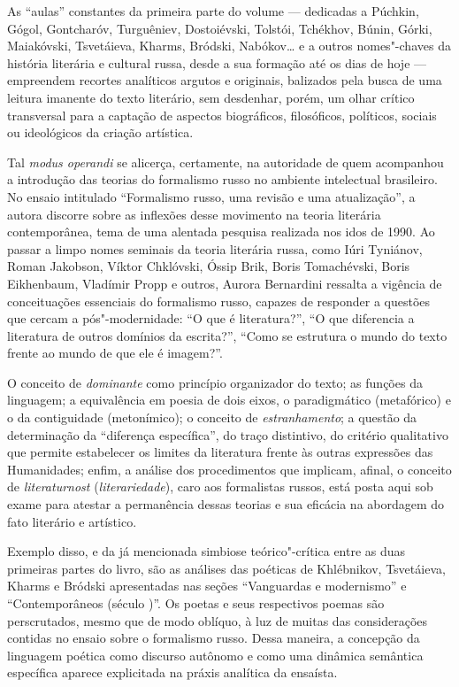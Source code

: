 As ``aulas'' constantes da primeira parte do volume --- dedicadas a
Púchkin, Gógol, Gontcharóv, Turguêniev, Dostoiévski, Tolstói, Tchékhov,
Búnin, Górki, Maiakóvski, Tsvetáieva, Kharms, Bródski, Nabókov\ldots{} e a outros nomes"-chaves da
história literária e cultural russa, desde a sua formação até os dias de
hoje --- empreendem recortes analíticos argutos e originais, balizados pela busca de uma leitura imanente do
texto literário, sem desdenhar, porém, um olhar crítico transversal para
a captação de aspectos biográficos, filosóficos, políticos, sociais ou
ideológicos da criação artística.

Tal \emph{modus operandi} se alicerça, certamente, na autoridade de quem
acompanhou a introdução das teorias do formalismo russo no ambiente
intelectual brasileiro. No ensaio intitulado ``Formalismo
russo, uma revisão e uma atualização'', a autora discorre sobre as
inflexões desse movimento na teoria literária contemporânea,
tema de uma alentada pesquisa realizada nos idos de 1990. Ao
passar a limpo nomes seminais da teoria literária russa, como Iúri
Tyniánov, Roman Jakobson, Víktor Chklóvski, Óssip Brik, Boris Tomachévski,
Boris Eikhenbaum, Vladímir Propp e outros, Aurora Bernardini ressalta a
vigência de conceituações essenciais do formalismo russo, capazes de
responder a questões que cercam a pós"-modernidade: ``O que é
literatura?'', ``O que diferencia a literatura de outros domínios da
escrita?'', ``Como se estrutura o mundo do texto frente ao mundo de que
ele é imagem?''.

O conceito de \emph{dominante} como princípio organizador do texto; as
funções da linguagem; a equivalência em poesia de dois
eixos, o paradigmático (metafórico) e o da contiguidade (metonímico); o
conceito de \emph{estranhamento}; a questão da determinação da ``diferença
específica'', do traço distintivo, do critério qualitativo que permite estabelecer os limites da literatura frente às outras
expressões das Humanidades; enfim, a análise dos procedimentos que
implicam, afinal, o conceito de \emph{literaturnost} (\emph{literariedade}), caro
aos formalistas russos, está posta aqui sob exame para atestar
a permanência dessas teorias e sua eficácia na abordagem do fato
literário e artístico.

Exemplo disso, e da já mencionada simbiose teórico"-crítica entre as duas
primeiras partes do livro, são as análises das poéticas de Khlébnikov, Tsvetáieva,
Kharms e Bródski apresentadas nas seções ``Vanguardas e modernismo'' e ``Contemporâneos (século \scalebox{0.8}{XX})''. Os
poetas e seus respectivos poemas são perscrutados, mesmo que de modo
oblíquo, à luz de muitas das considerações contidas no ensaio
sobre o formalismo russo. Dessa maneira, a
concepção da linguagem poética como discurso autônomo e como uma
dinâmica semântica específica aparece explicitada na práxis analítica da ensaísta.

